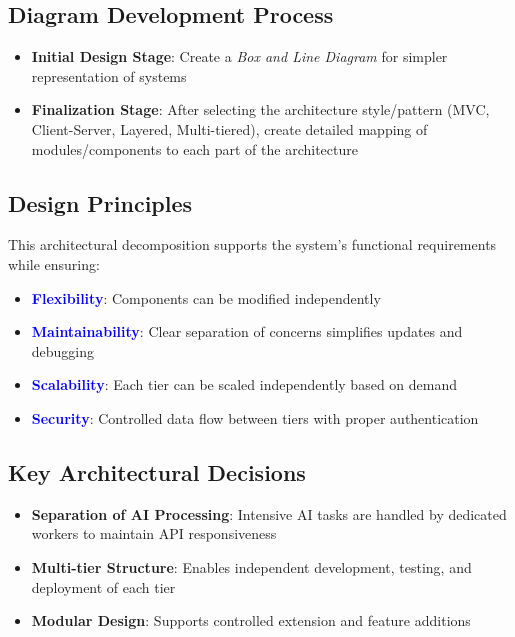 \subsection*{Diagram Development Process}
\begin{itemize}
    \item \textbf{Initial Design Stage}: Create a \textit{Box and Line Diagram} for simpler representation of systems
    \item \textbf{Finalization Stage}: After selecting the architecture style/pattern (MVC, Client-Server, Layered, Multi-tiered), create detailed mapping of modules/components to each part of the architecture
\end{itemize}

\subsection*{Design Principles}
This architectural decomposition supports the system's functional requirements while ensuring:

\begin{itemize}
    \item \textcolor{blue}{\textbf{Flexibility}}: Components can be modified independently
    \item \textcolor{blue}{\textbf{Maintainability}}: Clear separation of concerns simplifies updates and debugging
    \item \textcolor{blue}{\textbf{Scalability}}: Each tier can be scaled independently based on demand
    \item \textcolor{blue}{\textbf{Security}}: Controlled data flow between tiers with proper authentication
\end{itemize}

\subsection*{Key Architectural Decisions}
\begin{itemize}
    \item \textbf{Separation of AI Processing}: Intensive AI tasks are handled by dedicated workers to maintain API responsiveness
    \item \textbf{Multi-tier Structure}: Enables independent development, testing, and deployment of each tier
    \item \textbf{Modular Design}: Supports controlled extension and feature additions
\end{itemize}



